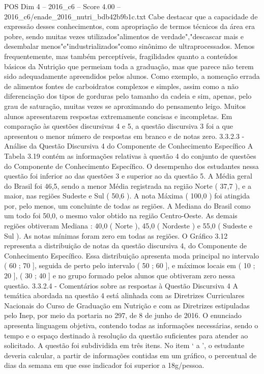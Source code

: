 \begin{textsample}{POS Dim 4 – 2016\_c6 – Score 4.00 – 2016\_c6/enade\_2016\_nutri\_bdb42b9b1c.txt}
Cabe destacar que a capacidade de expressão desses conhecimentos, com apropriação de termos técnicos da área era pobre, sendo muitas vezes utilizados"alimentos de verdade","descascar mais e desembalar menos"e"industrializados"como sinônimo de ultraprocessados.
Menos frequentemente, mas também perceptíveis, fragilidades quanto a conteúdos básicos da Nutrição que permeiam toda a graduação, mas que parece não terem sido adequadamente apreendidos pelos alunos.
Como exemplo, a nomeação errada de alimentos fontes de carboidratos complexos e simples, assim como a não diferenciação dos tipos de gorduras pelo tamanho da cadeia e sim, apenas, pelo grau de saturação, muitas vezes se aproximando do pensamento leigo.
Muitos alunos apresentarem respostas extremamente concisas e incompletas.
Em comparação às questões discursivas 4 e 5, a questão discursiva 3 foi a que apresentou o menor número de respostas em branco e de notas zero. 3.3.2.3 - Análise da Questão Discursiva 4 do Componente de Conhecimento Específico A Tabela 3.19 contém as informações relativas à questão 4 do conjunto de questões do Componente de Conhecimento Específico.
O desempenho dos estudantes nessa questão foi inferior ao das questões 3 e superior ao da questão 5.
A Média geral do Brasil foi 46,5, sendo a menor Média registrada na região Norte ( 37,7 ), e a maior, nas regiões Sudeste e Sul ( 50,6 ).
A nota Máxima ( 100,0 ) foi atingida por, pelo menos, um concluinte de todas as regiões.
A Mediana do Brasil como um todo foi 50,0, o mesmo valor obtido na região Centro-Oeste.
As demais regiões obtiveram Mediana : 40,0 ( Norte ), 45,0 ( Nordeste ) e 55,0 ( Sudeste e Sul ).
As notas mínimas foram zero em todas as regiões.
O Gráfico 3.12 representa a distribuição de notas da questão discursiva 4, do Componente de Conhecimento Específico.
Essa distribuição apresenta moda principal no intervalo ( 60 ; 70 ], seguida de perto pelo intervalo ( 50 ; 60 ], e máximos locais em ( 10 ; 20 ], ( 30 ; 40 ] e no grupo formado pelos alunos que obtiveram zero nessa questão. 3.3.2.4 - Comentários sobre as respostas à Questão Discursiva 4 A temática abordada na questão 4 está alinhada com as Diretrizes Curriculares Nacionais do Curso de Graduação em Nutrição e com as Diretrizes estipuladas pelo Inep, por meio da portaria no 297, de 8 de junho de 2016.
O enunciado apresenta linguagem objetiva, contendo todas as informações necessárias, sendo o tempo e o espaço destinado à resolução da questão suficientes para atender ao solicitado.
A questão foi subdividida em três itens.
No item ‘ a ’, o estudante deveria calcular, a partir de informações contidas em um gráfico, o percentual de dias da semana em que esse indicador foi superior a 18g/pessoa.

\end{textsample}
